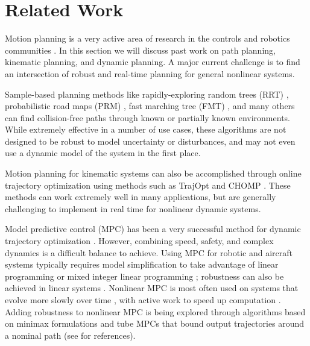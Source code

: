 \section{Related Work \label{sec:relatedwork}}
Motion planning is a very active area of research in the controls and robotics communities \cite{Hoy2015}.  In this section we will discuss past work on path planning, kinematic planning, and dynamic planning.  A major current challenge is to find an intersection of robust and real-time planning for general nonlinear systems. 

Sample-based planning methods like rapidly-exploring random trees (RRT) \cite{Kuffner2000}, probabilistic road maps (PRM) \cite{Kavraki1996}, fast marching tree (FMT) \cite{Janson2015}, and many others \cite{Richter2016, Karaman2011, Kobilarov2012} can find collision-free paths through known or partially known environments. While extremely effective in a number of use cases, these algorithms are not designed to be robust to model uncertainty or disturbances, and may not even use a dynamic model of the system in the first place.

Motion planning for kinematic systems can also be accomplished through online trajectory optimization using methods such as TrajOpt \cite{Schulman2013} and CHOMP \cite{Ratliff2009}. These methods can work extremely well in many applications, but are generally challenging to implement in real time for nonlinear dynamic systems.

Model predictive control (MPC) has been a very successful method for dynamic trajectory optimization \cite{Qin2003}.  However, combining speed, safety, and complex dynamics is a difficult balance to achieve. Using MPC for robotic and aircraft systems typically requires model simplification to take advantage of linear programming or mixed integer linear programming \cite{Vitus2008, Zeilinger2011, Richter2012}; robustness can also be achieved in linear systems \cite{Richards2006, DiCairano2016}. Nonlinear MPC is most often used on systems that evolve more slowly over time \cite{Diehl2002, Schildbach2016}, with active work to speed up computation \cite{Diehl2009, Neunert2016}. Adding robustness to nonlinear MPC is being explored through algorithms based on minimax formulations and tube MPCs that bound output trajectories around a nominal path (see \cite{Hoy2015} for references).


